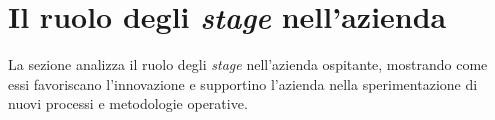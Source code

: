 \section{Il ruolo degli \textit{stage} nell’azienda}
La sezione analizza il ruolo degli \textit{stage} nell’azienda ospitante, mostrando come essi favoriscano l’innovazione e supportino l’azienda nella sperimentazione di nuovi processi e metodologie operative.